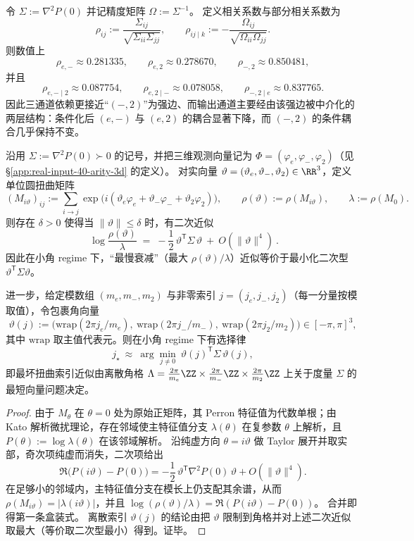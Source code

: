 \begin{proposition}\label{prop:real-input-40-precision-matrix-mediation}
令 \(\Sigma:=\nabla^2P(0)\) 并记精度矩阵 \(\Omega:=\Sigma^{-1}\)。
定义相关系数与部分相关系数为
\[
\rho_{ij}:=\frac{\Sigma_{ij}}{\sqrt{\Sigma_{ii}\Sigma_{jj}}},
\qquad
\rho_{ij\mid k}:=-\frac{\Omega_{ij}}{\sqrt{\Omega_{ii}\Omega_{jj}}}.
\]
则数值上
\[
\rho_{e,-}\approx 0.281335,\qquad
\rho_{e,2}\approx 0.278670,\qquad
\rho_{-,2}\approx 0.850481,
\]
并且
\[
\rho_{e,-\mid 2}\approx 0.087754,\qquad
\rho_{e,2\mid -}\approx 0.078058,\qquad
\rho_{-,2\mid e}\approx 0.837765.
\]
因此三通道依赖更接近“\((-,2)\)”为强边、而输出通道主要经由该强边被中介化的两层结构：条件化后 \((e,-)\) 与 \((e,2)\) 的耦合显著下降，而 \((-,2)\) 的条件耦合几乎保持不变。
\end{proposition}

\begin{theorem}\label{thm:real-input-40-near-coboundary-svp}
沿用 \(\Sigma:=\nabla^2P(0)\succ 0\) 的记号，并把三维观测向量记为
\(
\Phi=(\varphi_e,\varphi_-,\varphi_2)
\)（见 \S\ref{app:real-input-40-arity-3d} 的定义）。
对实向量 \(\vartheta=(\vartheta_e,\vartheta_-,\vartheta_2)\in\RR^3\)，定义单位圆扭曲矩阵
\[
(M_{i\vartheta})_{ij}:=\sum_{i\to j}\exp\bigl(i(\vartheta_e\varphi_e+\vartheta_-\varphi_-+\vartheta_2\varphi_2)\bigr),
\qquad
\rho(\vartheta):=\rho(M_{i\vartheta}),
\qquad
\lambda:=\rho(M_0).
\]
则存在 \(\delta>0\) 使得当 \(\|\vartheta\|\le \delta\) 时，有二次近似
\[
\boxed{\ \log\frac{\rho(\vartheta)}{\lambda}
\;=\;
-\frac{1}{2}\,\vartheta^{\mathsf T}\Sigma\,\vartheta\ +\ O(\|\vartheta\|^4)\ }.
\]
因此在小角 regime 下，“最慢衰减”（最大 \(\rho(\vartheta)/\lambda\)）近似等价于最小化二次型 \(\vartheta^{\mathsf T}\Sigma\vartheta\)。
\par
进一步，给定模数组 \((m_e,m_-,m_2)\) 与非零索引 \(j=(j_e,j_-,j_2)\)（每一分量按模取值），令包裹角向量
\[
\vartheta(j):=\bigl(\mathrm{wrap}(2\pi j_e/m_e),\ \mathrm{wrap}(2\pi j_-/m_-),\ \mathrm{wrap}(2\pi j_2/m_2)\bigr)\in[-\pi,\pi]^3,
\]
其中 \(\mathrm{wrap}\) 取主值代表元。则在小角 regime 下有选择律
\[
j_\star\ \approx\ \arg\min_{j\neq 0}\ \vartheta(j)^{\mathsf T}\Sigma\,\vartheta(j),
\]
即最坏扭曲索引近似由离散角格
\(
\Lambda=\frac{2\pi}{m_e}\ZZ\times\frac{2\pi}{m_-}\ZZ\times\frac{2\pi}{m_2}\ZZ
\)
上关于度量 \(\Sigma\) 的最短向量问题决定。
\end{theorem}
\begin{proof}
由于 \(M_\theta\) 在 \(\theta=0\) 处为原始正矩阵，其 Perron 特征值为代数单根；由 Kato 解析微扰理论，存在邻域使主特征值分支 \(\lambda(\theta)\) 在复参数 \(\theta\) 上解析，且 \(P(\theta):=\log\lambda(\theta)\) 在该邻域解析。
沿纯虚方向 \(\theta=i\vartheta\) 做 Taylor 展开并取实部，奇次项纯虚而消失，二次项给出
\[
\Re\bigl(P(i\vartheta)-P(0)\bigr)=-\frac12\,\vartheta^{\mathsf T}\nabla^2P(0)\,\vartheta+O(\|\vartheta\|^4).
\]
在足够小的邻域内，主特征值分支在模长上仍支配其余谱，从而 \(\rho(M_{i\vartheta})=|\lambda(i\vartheta)|\)，并且
\(
\log(\rho(\vartheta)/\lambda)=\Re(P(i\vartheta)-P(0))
\)。
合并即得第一条盒装式。
离散索引 \(\vartheta(j)\) 的结论由把 \(\vartheta\) 限制到角格并对上述二次近似取最大（等价取二次型最小）得到。证毕。
\end{proof}

